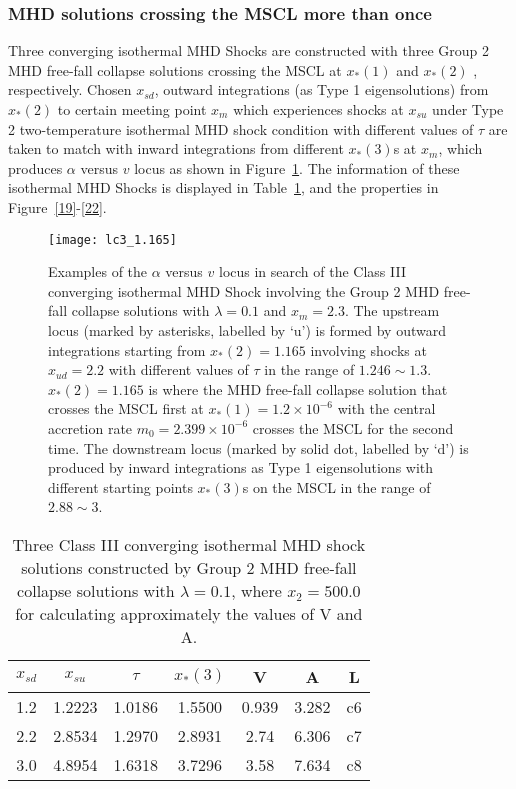 \documentclass[fleqn,usenatbib]{mnras}
\begin{document}

\subsubsection{MHD solutions crossing the MSCL more than once}
\label{s5.3.2}
Three converging isothermal MHD Shocks are constructed with three Group 2 MHD free-fall collapse solutions crossing the MSCL at $x_{*}(1)$ and $x_{*}(2)$ \citep{yuLou2005}, respectively. Chosen $x_{sd}$, outward integrations (as Type 1 eigensolutions) from $x_{*}(2)$ to certain meeting point $x_{m}$ which experiences shocks at $x_{su}$ under Type 2 two-temperature isothermal MHD shock condition with different values of $\tau$ are taken to match with inward integrations from different $x_{*}(3)$s at $x_{m}$, which produces $\alpha$ versus $v$ locus as shown in Figure~\ref{18}. The information of these isothermal MHD Shocks is displayed in Table~\ref{t5}, and the properties in Figure~\ref{19}-\ref{22}.

\begin{figure}
\centering
\texttt{[image: lc3\_1.165]}
\caption{Examples of the $\alpha$ versus $v$ locus in search of the Class III converging isothermal MHD Shock involving the Group 2 MHD free-fall collapse solutions with $\lambda=0.1$ and $x_{m}=2.3$. The upstream locus (marked by asterisks, labelled by `u') is formed by outward integrations starting from $x_{*}(2)=1.165$ involving shocks at $x_{ud}=2.2$ with different values of $\tau$ in the range of $1.246\sim 1.3$. $x_{*}(2)=1.165$ is where the MHD free-fall collapse solution that crosses the MSCL first at $x_{*}(1)=1.2\times 10^{-6}$ with the central accretion rate $m_{0}=2.399\times 10^{-6}$ crosses the MSCL for the second time. The downstream locus (marked by solid dot, labelled by `d') is produced by inward integrations as Type 1 eigensolutions with different starting points $x_{*}(3)$s on the MSCL in the range of $2.88\sim 3$.}
\label{18}
\end{figure}

\begin{table}
\centering
\caption{Three Class III converging isothermal MHD shock solutions constructed by Group 2 MHD free-fall collapse solutions with $\lambda=0.1$, where $x_{2}=500.0$ for calculating approximately the values of V and A.}
\begin{tabular}{ccccccc}
\hline
$x_{sd}$ & $x_{su}$ & $\tau$ & $x_{*}(3)$ & V & A & L\\
\hline
1.2 & 1.2223 & 1.0186 & 1.5500 & 0.939 & 3.282 & c6\\
2.2 & 2.8534 & 1.2970 & 2.8931 & 2.74 & 6.306 & c7\\
3.0 & 4.8954 & 1.6318 & 3.7296 & 3.58 & 7.634  & c8\\
\hline
\end{tabular}
\label{t5}
\end{table}
\end{document}
